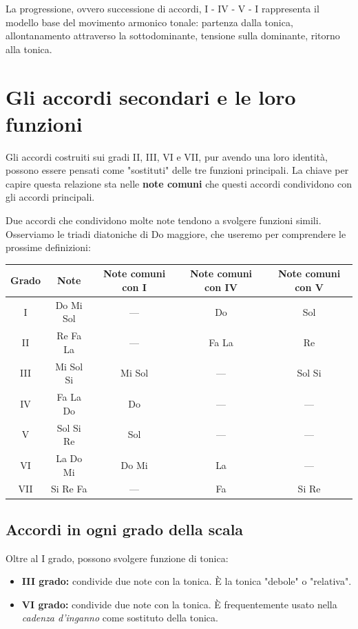 	La progressione, ovvero successione di accordi, I - IV - V - I rappresenta il modello base del movimento armonico tonale: partenza dalla tonica, allontanamento attraverso la sottodominante, tensione sulla dominante, ritorno alla tonica.

\section{Gli accordi secondari e le loro funzioni}
\label{sec:accordi_secondari}

Gli accordi costruiti sui gradi II, III, VI e VII, pur avendo una loro identità, possono essere pensati come "sostituti" delle tre funzioni principali. La chiave per capire questa relazione sta nelle \textbf{note comuni} che questi accordi condividono con gli accordi principali.

\begin{esempio}
\end{esempio}

Due accordi che condividono molte note tendono a svolgere funzioni simili. Osserviamo le triadi diatoniche di Do maggiore, che useremo per comprendere le prossime definizioni:

\begin{center}
\begin{tabular}{|c|c|c|c|c|}
\hline
\textbf{Grado} & \textbf{Note} & \textbf{Note comuni con I} & \textbf{Note comuni con IV} & \textbf{Note comuni con V} \\
\hline
I & Do Mi Sol & --- & Do & Sol \\
II & Re Fa La & --- & Fa La & Re \\
III & Mi Sol Si & Mi Sol & --- & Sol Si \\
IV & Fa La Do & Do & --- & --- \\
V & Sol Si Re & Sol & --- & --- \\
VI & La Do Mi & Do Mi & La & --- \\
VII & Si Re Fa & --- & Fa & Si Re \\
\hline
\end{tabular}
\end{center}

\subsection{Accordi in ogni grado della scala}
\label{subsec:accordi_funzioni}

\begin{definizione}
	\label{def:accordi_tonica}
	Oltre al I grado, possono svolgere funzione di tonica:
	\begin{itemize}
		\item \textbf{III grado:} condivide due note con la tonica. È la tonica "debole" o "relativa".
		\item \textbf{VI grado:} condivide due note con la tonica. È frequentemente usato nella \textit{cadenza d'inganno} come sostituto della tonica.
	\end{itemize}
\end{definizione}


